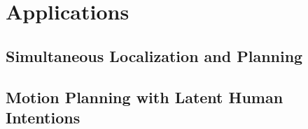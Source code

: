 \chapter{Applications}\label{chap:applications}

\section{Simultaneous Localization and Planning}

\section{Motion Planning with Latent Human Intentions}
